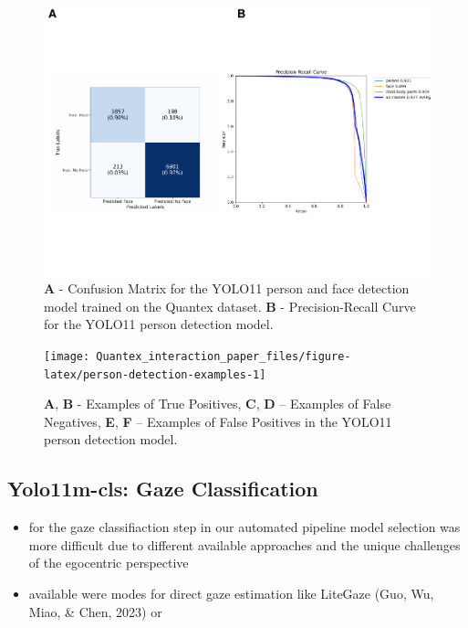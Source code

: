 \documentclass[
  man,floatsintext]{apa6}
\providecommand{\tightlist}{%
  \setlength{\itemsep}{0pt}\setlength{\parskip}{0pt}}
\begin{document}
\begin{figure}

{\centering \includegraphics{Quantex_interaction_paper_files/figure-latex/person-metrics-1} 

}

\caption{\textbf{A} - Confusion Matrix for the YOLO11 person and face detection model trained on the Quantex dataset. \textbf{B} - Precision-Recall Curve for the YOLO11 person detection model.}\label{fig:person-metrics}
\end{figure}

\begin{figure}

{\centering \texttt{[image: Quantex\_interaction\_paper\_files/figure-latex/person-detection-examples-1]} 

}

\caption{\textbf{A}, \textbf{B} - Examples of True Positives, \textbf{C}, \textbf{D} – Examples of False Negatives, \textbf{E}, \textbf{F} – Examples of False Positives in the YOLO11 person detection model.}\label{fig:person-detection-examples}
\end{figure}

\subsection{Yolo11m-cls: Gaze Classification}\label{yolo11m-cls-gaze-classification}

\begin{itemize}
\tightlist
\item
  for the gaze classifiaction step in our automated pipeline model selection was more difficult due to different available approaches and the unique challenges of the egocentric perspective
\item
  available were modes for direct gaze estimation like LiteGaze (Guo, Wu, Miao, \& Chen, 2023) or
\end{itemize}
\end{document}
